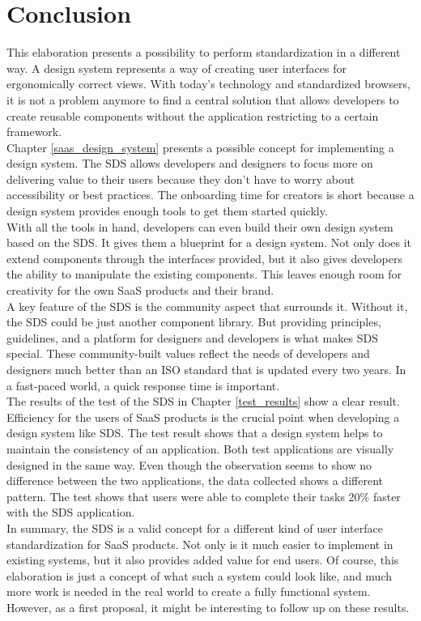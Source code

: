 \newpage
\section{Conclusion}
This elaboration presents a possibility to perform standardization in a different way. A design system represents a way of creating user interfaces for ergonomically correct views. With today's technology and standardized browsers, it is not a problem anymore to find a central solution that allows developers to create reusable components without the application restricting to a certain framework. \\
Chapter \ref{saas_design_system} presents a possible concept for implementing a design system. The \acl{SDS} allows developers and designers to focus more on delivering value to their users because they don't have to worry about accessibility or best practices. The onboarding time for creators is short because a design system provides enough tools to get them started quickly. \\
With all the tools in hand, developers can even build their own design system based on the \ac{SDS}. It gives them a blueprint for a design system. Not only does it extend components through the interfaces provided, but it also gives developers the ability to manipulate the existing components. This leaves enough room for creativity for the own SaaS products and their brand.\\
A key feature of the \ac{SDS} is the community aspect that surrounds it. Without it, the \ac{SDS} could be just another component library. But providing principles, guidelines, and a platform for designers and developers is what makes \ac{SDS} special. These community-built values reflect the needs of developers and designers much better than an ISO standard that is updated every two years. In a fast-paced world, a quick response time is important.\\
The results of the test of the \ac{SDS} in Chapter \ref{test_results} show a clear result. Efficiency for the users of SaaS products is the crucial point when developing a design system like \ac{SDS}. The test result shows that a design system helps to maintain the consistency of an application. Both test applications are visually designed in the same way. Even though the observation seems to show no difference between the two applications, the data collected shows a different pattern. The test shows that users were able to complete their tasks 20\% faster with the \ac{SDS} application. \\
In summary, the \ac{SDS} is a valid concept for a different kind of user interface standardization for SaaS products. Not only is it much easier to implement in existing systems, but it also provides added value for end users. Of course, this elaboration is just a concept of what such a system could look like, and much more work is needed in the real world to create a fully functional system. However, as a first proposal, it might be interesting to follow up on these results.
